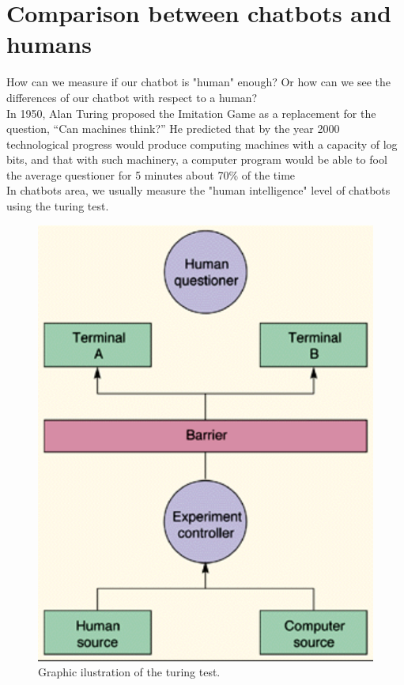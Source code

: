 \documentclass[12pt,twoside]{article}
\theoremstyle{plain}
\theoremstyle{definition}
\theoremstyle{remark}
\begin{document}
\section{Comparison between chatbots and humans}
\label{sec:comparison}

How can we measure if our chatbot is "human" enough? Or how can we see the differences of our chatbot with respect to a human?\\

In 1950, Alan Turing proposed the Imitation Game as a replacement for the question, “Can machines think?” He predicted that by the year 2000 technological progress would produce computing machines with a capacity of log bits, and that with such machinery, a computer program would be able to fool the average questioner for 5 minutes about 70\% of the time \cite{turing2009computing}\\

In chatbots area, we usually measure the "human intelligence" level of chatbots using the turing test.

\begin{figure}[H]
	\centering
	\includegraphics[scale=0.8]{./Pictures/turing_test.png}
	\caption{Graphic ilustration of the turing test.\cite{turing_test_image}}
	\label{fig::turing_test} 
\end{figure}
\end{document}
